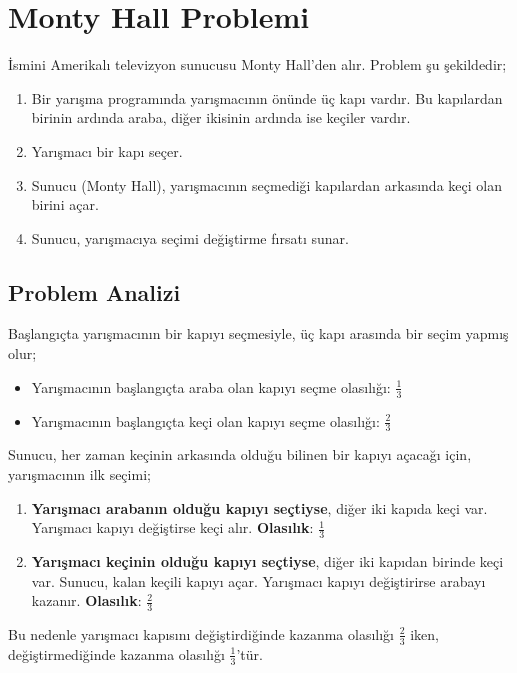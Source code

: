 \section{Monty Hall Problemi}

İsmini Amerikalı televizyon sunucusu Monty Hall'den alır. Problem şu şekildedir;

\begin{enumerate}
	\item Bir yarışma programında yarışmacının önünde üç kapı vardır. Bu kapılardan birinin ardında araba, diğer ikisinin ardında ise keçiler vardır.
	\item Yarışmacı bir kapı seçer.
	\item Sunucu (Monty Hall), yarışmacının seçmediği kapılardan arkasında keçi olan birini açar.
	\item Sunucu, yarışmacıya seçimi değiştirme fırsatı sunar.
\end{enumerate}

\subsection{Problem Analizi}
Başlangıçta yarışmacının bir kapıyı seçmesiyle, üç kapı arasında bir seçim yapmış olur;

\begin{itemize}
	\item Yarışmacının başlangıçta araba olan kapıyı seçme olasılığı: $\frac{1}{3}$
	\item Yarışmacının başlangıçta keçi olan kapıyı seçme olasılığı: $\frac{2}{3}$
\end{itemize}

Sunucu, her zaman keçinin arkasında olduğu bilinen bir kapıyı açacağı için, yarışmacının ilk seçimi;

\begin{enumerate}
	\item \textbf{Yarışmacı arabanın olduğu kapıyı seçtiyse}, diğer iki kapıda keçi var. Yarışmacı kapıyı değiştirse keçi alır. \textbf{Olasılık}: $\frac{1}{3}$
	\item \textbf{Yarışmacı keçinin olduğu kapıyı seçtiyse}, diğer iki kapıdan birinde keçi var. Sunucu, kalan keçili kapıyı açar. Yarışmacı kapıyı değiştirirse arabayı kazanır. \textbf{Olasılık}: $\frac{2}{3}$
\end{enumerate}

Bu nedenle yarışmacı kapısını değiştirdiğinde kazanma olasılığı $\frac{2}{3}$ iken, değiştirmediğinde kazanma olasılığı $\frac{1}{3}$'tür.

\newpage